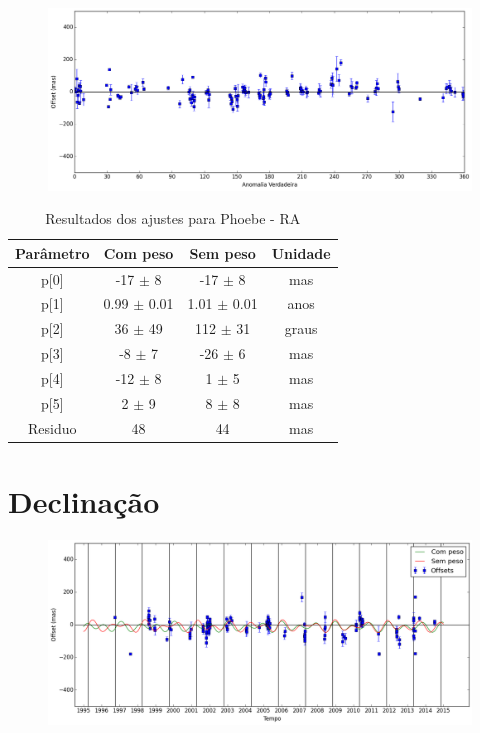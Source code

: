 \documentclass[11pt,a4paper]{report}
\begin{document}
\begin{figure}[h]
\includegraphics[scale=0.45]{Phoebe/RA_anom.png}  
\end{figure}

\begin{table}[h!]
\caption{\label{Tab: Phoebe-RA} Resultados dos ajustes para Phoebe - RA}
\begin{centering}
\begin{tabular}{cccc}
\hline
\hline
Parâmetro & Com peso & Sem peso & Unidade\tabularnewline
\hline
p[0] & -17 $\pm$ 8 & -17 $\pm$ 8 & mas\\
p[1] & 0.99 $\pm$ 0.01 & 1.01 $\pm$ 0.01 & anos\\
p[2] & 36 $\pm$ 49 & 112 $\pm$ 31 & graus\\
p[3] & -8 $\pm$ 7 & -26 $\pm$ 6 & mas\\
p[4] & -12 $\pm$ 8 & 1 $\pm$ 5 & mas\\
p[5] & 2 $\pm$ 9 & 8 $\pm$ 8 & mas\\
Residuo & 48 & 44 & mas\\
\hline 
\end{tabular} 
\par\end{centering}
\end{table}

\section*{Declinação}

\begin{figure}[h]
\includegraphics[scale=0.45]{Phoebe/DEC.png} 
\end{figure}
\end{document}
